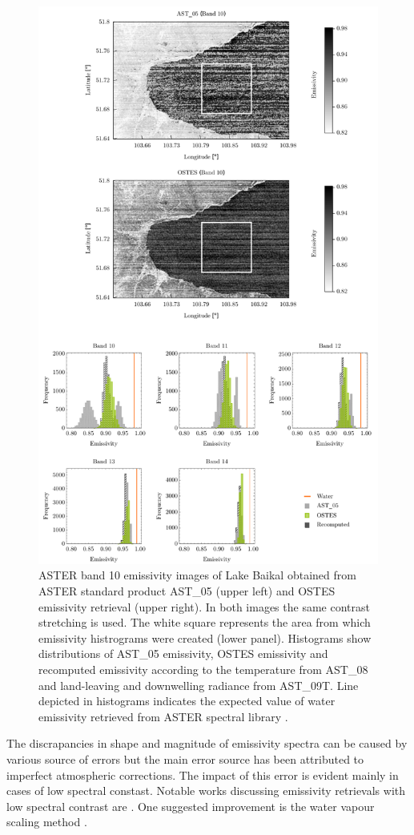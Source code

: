 \begin{figure}[!t]
\centering
\includegraphics[width=0.78\linewidth]{pics/Chapter_04/Baikal.pdf}
\vspace{1.5 em}
\caption{
ASTER band 10 emissivity images of Lake Baikal obtained from ASTER standard product AST\_05 (upper left) and OSTES emissivity retrieval (upper right). In both images the same contrast stretching is used. The white square represents the area from which emissivity histrograms were created (lower panel). Histograms show distributions of AST\_05 emissivity, OSTES emissivity and recomputed emissivity according to the temperature from AST\_08 and land-leaving and downwelling radiance from AST\_09T. Line depicted in histograms indicates the expected value of water emissivity retrieved from ASTER spectral library \cite{BH09}.}
\label{fig:Bajkal}
\end{figure}

The discrapancies in shape and magnitude of emissivity spectra can be caused by various source of errors but the main error source has been attributed to imperfect atmospheric corrections. The impact of this error is evident mainly in cases of low spectral constast. Notable works discussing emissivity retrievals with low spectral contrast are \cite{TP01, TP05, TP05-2, CC07, SJ07}. One suggested improvement is the water vapour scaling method \cite{T05, GA11}.

